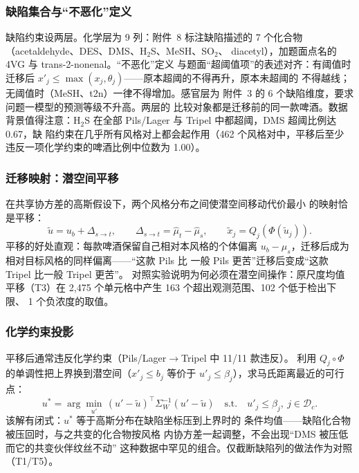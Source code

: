 \documentclass[12pt,a4paper]{article}
\begin{document}
\subsubsection{缺陷集合与``不恶化''定义}

缺陷约束设两层。化学层为 9 列：附件~8 标注缺陷描述的
7 个化合物（acetaldehyde、DES、DMS、H$_2$S、MeSH、SO$_2$、
diacetyl），加题面点名的 4VG 与 trans-2-nonenal。``不恶化''定义
与题面``超阈值项''的表述对齐：有阈值时迁移后
$x'_j\le\max(x_j,\theta_j)$——原本超阈的不得再升，原本未超阈的
不得越线；无阈值时（MeSH、t2n）一律不得增加。感官层为
附件~3 的 6 个缺陷维度，要求问题一模型的预测等级不升高。两层的
比较对象都是迁移前的同一款啤酒。数据背景值得注意：H$_2$S 在全部
Pils/Lager 与 Tripel 中都超阈，DMS 超阈比例达 0.67，缺
陷约束在几乎所有风格对上都会起作用（462 个风格对中，平移后至少
违反一项化学约束的啤酒比例中位数为 1.00）。

\subsubsection{迁移映射：潜空间平移}

在共享协方差的高斯假设下，两个风格分布之间使潜空间移动代价最小
的映射恰是平移：
\begin{equation}
  \tilde u=u_b+\Delta_{s\to t},\qquad \Delta_{s\to t}=\hat\mu_t-\hat\mu_s,
  \qquad \tilde x_j=Q_j(\Phi(\tilde u_j)).
\end{equation}
平移的好处直观：每款啤酒保留自己相对本风格的个体偏离
$u_b-\mu_s$，迁移后成为相对目标风格的同样偏离——``这款 Pils 比
一般 Pils 更苦''迁移后变成``这款 Tripel 比一般 Tripel 更苦''。
对照实验说明为何必须在潜空间操作：原尺度均值平移（T3）在
2{,}475 个单元格中产生 163 个超出观测范围、102 个低于检出下限、
1 个负浓度的取值。

\subsubsection{化学约束投影}

平移后通常违反化学约束（Pils/Lager$\to$Tripel 中 11/11 款违反）。
利用 $Q_j\circ\Phi$ 的单调性把上界换到潜空间（$x'_j\le b_j$
等价于 $u'_j\le\beta_j$），求马氏距离最近的可行点：
\begin{equation}
  u^*=\arg\min_{u'}\,(u'-\tilde u)^\top\Sigma_W^{-1}(u'-\tilde u)
  \quad\text{s.t.}\quad u'_j\le\beta_j,\ j\in\mathcal D_c .
\end{equation}
该解有闭式：$u^*$ 等于高斯分布在缺陷坐标压到上界时的
条件均值——缺陷化合物被压回时，与之共变的化合物按风格
内协方差一起调整，不会出现``DMS 被压低而它的共变伙伴纹丝不动''
这种数据中罕见的组合。仅截断缺陷列的做法作为对照（T1/T5）。
\end{document}
